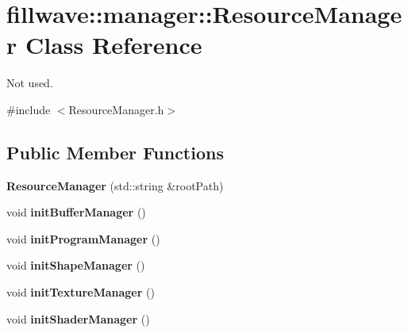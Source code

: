 \hypertarget{classfillwave_1_1manager_1_1ResourceManager}{}\section{fillwave\+:\+:manager\+:\+:Resource\+Manager Class Reference}
\label{classfillwave_1_1manager_1_1ResourceManager}


Not used.  




{\ttfamily \#include $<$Resource\+Manager.\+h$>$}

\subsection*{Public Member Functions}
\begin{DoxyCompactItemize}
\item 
\hypertarget{classfillwave_1_1manager_1_1ResourceManager_a4f021487f1526964c1a790e7e59c44e8}{}{\bfseries Resource\+Manager} (std\+::string \&root\+Path)\label{classfillwave_1_1manager_1_1ResourceManager_a4f021487f1526964c1a790e7e59c44e8}

\item 
\hypertarget{classfillwave_1_1manager_1_1ResourceManager_acbdf9ccf516895c807a4e118f9b8413f}{}void {\bfseries init\+Buffer\+Manager} ()\label{classfillwave_1_1manager_1_1ResourceManager_acbdf9ccf516895c807a4e118f9b8413f}

\item 
\hypertarget{classfillwave_1_1manager_1_1ResourceManager_a9ed63320ab5f581833c53dd8050184ce}{}void {\bfseries init\+Program\+Manager} ()\label{classfillwave_1_1manager_1_1ResourceManager_a9ed63320ab5f581833c53dd8050184ce}

\item 
\hypertarget{classfillwave_1_1manager_1_1ResourceManager_a96f65ccdc7c927a06833ec81983ac4ac}{}void {\bfseries init\+Shape\+Manager} ()\label{classfillwave_1_1manager_1_1ResourceManager_a96f65ccdc7c927a06833ec81983ac4ac}

\item 
\hypertarget{classfillwave_1_1manager_1_1ResourceManager_a431cb0e845a928a6b5ca01253559300b}{}void {\bfseries init\+Texture\+Manager} ()\label{classfillwave_1_1manager_1_1ResourceManager_a431cb0e845a928a6b5ca01253559300b}

\item 
\hypertarget{classfillwave_1_1manager_1_1ResourceManager_aa4a64e91e41387e73a01d444a16a54dc}{}void {\bfseries init\+Shader\+Manager} ()\label{classfillwave_1_1manager_1_1ResourceManager_aa4a64e91e41387e73a01d444a16a54dc}


\end{DoxyCompactItemize}
